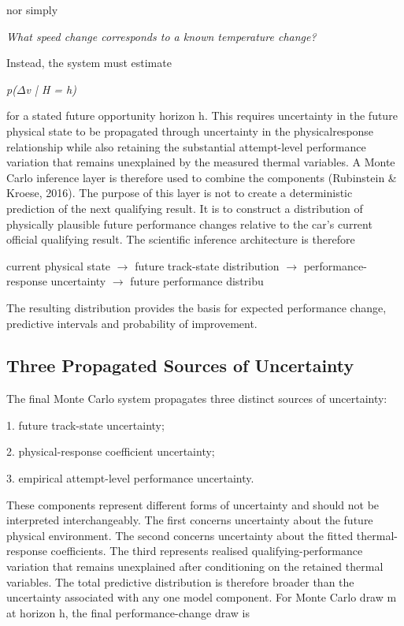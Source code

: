 nor simply

\begin{center}\textit{What speed change corresponds to a known temperature change?}\end{center}

Instead, the system must estimate

\begin{center}\textit{p(\ensuremath{\Delta}v | H = h)}\end{center}

for a stated future opportunity horizon h. This requires uncertainty in the future physical state to be propagated through uncertainty in the physicalresponse relationship while also retaining the substantial attempt-level performance variation that remains unexplained by the measured thermal variables. A Monte Carlo inference layer is therefore used to combine the components (Rubinstein \& Kroese, 2016). The purpose of this layer is not to create a deterministic prediction of the next qualifying result. It is to construct a distribution of physically plausible future performance changes relative to the car's current official qualifying result. The scientific inference architecture is therefore

current physical state \ensuremath{\rightarrow} future track-state distribution \ensuremath{\rightarrow} performance-response uncertainty \ensuremath{\rightarrow} future performance distribu

The resulting distribution provides the basis for expected performance change, predictive intervals and probability of improvement.

\subsection{Three Propagated Sources of Uncertainty}
The final Monte Carlo system propagates three distinct sources of uncertainty:

1. future track-state uncertainty;

2. physical-response coefficient uncertainty;

3. empirical attempt-level performance uncertainty.

These components represent different forms of uncertainty and should not be interpreted interchangeably. The first concerns uncertainty about the future physical environment. The second concerns uncertainty about the fitted thermal-response coefficients. The third represents realised qualifying-performance variation that remains unexplained after conditioning on the retained thermal variables. The total predictive distribution is therefore broader than the uncertainty associated with any one model component. For Monte Carlo draw m at horizon h, the final performance-change draw is

